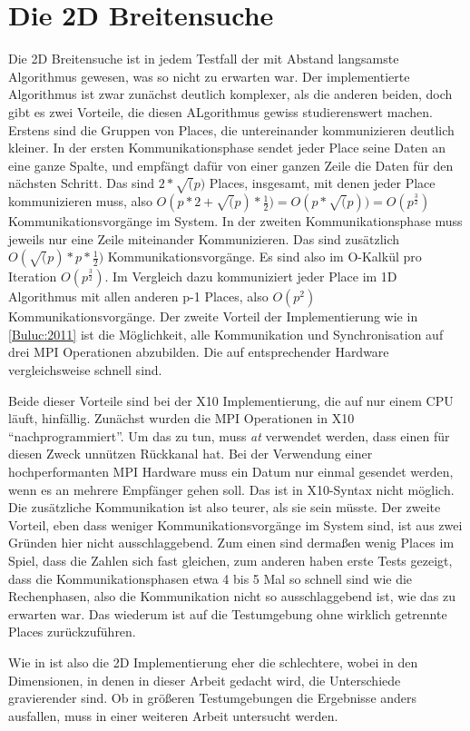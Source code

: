 \section{Die 2D Breitensuche} %
\label{sec:die_2d_breitensuche}
Die 2D Breitensuche ist in jedem Testfall der mit Abstand langsamste Algorithmus gewesen, was so nicht zu erwarten war. Der implementierte Algorithmus ist zwar zunächst deutlich komplexer, als die anderen beiden, doch gibt es zwei Vorteile, die diesen ALgorithmus gewiss studierenswert machen. Erstens sind die Gruppen von Places, die untereinander kommunizieren deutlich kleiner. In der ersten Kommunikationsphase sendet jeder Place seine Daten an eine ganze Spalte, und empfängt dafür von einer ganzen Zeile die Daten für den nächsten Schritt. Das sind $2 * \sqrt(p)$ Places, insgesamt, mit denen jeder Place kommunizieren muss, also $O(p * 2 + \sqrt(p) * \frac{1}{2}) = O(p * \sqrt(p))= O(p^{\frac{3}{2}})$ Kommunikationsvorgänge im System. In der zweiten Kommunikationsphase muss jeweils nur eine Zeile miteinander Kommunizieren. Das sind zusätzlich $O(\sqrt(p) * p * \frac{1}{2})$ Kommunikationsvorgänge. Es sind also im O-Kalkül pro Iteration $O(p^{\frac{3}{2}})$. Im Vergleich dazu kommuniziert jeder Place im 1D Algorithmus mit allen anderen p-1 Places, also $O(p^2)$ Kommunikationsvorgänge. Der zweite Vorteil der Implementierung wie in \ref{Buluc:2011} ist die Möglichkeit, alle Kommunikation und Synchronisation auf drei MPI Operationen abzubilden. Die auf entsprechender Hardware vergleichsweise schnell sind. 

Beide dieser Vorteile sind bei der X10 Implementierung, die auf nur einem CPU läuft, hinfällig. Zunächst wurden die MPI Operationen in X10 \enquote{nachprogrammiert}. Um das zu tun, muss \textit{at} verwendet werden, dass einen für diesen Zweck unnützen Rückkanal hat. Bei der Verwendung einer hochperformanten MPI Hardware muss ein Datum nur einmal gesendet werden, wenn es an mehrere Empfänger gehen soll. Das ist in X10-Syntax nicht möglich. Die zusätzliche Kommunikation ist also teurer, als sie sein müsste. 
Der zweite Vorteil, eben dass weniger Kommunikationsvorgänge im System sind, ist aus zwei Gründen hier nicht ausschlaggebend. Zum einen sind dermaßen wenig Places im Spiel, dass die Zahlen sich fast gleichen, zum anderen haben erste Tests gezeigt, dass die Kommunikationsphasen etwa 4 bis 5 Mal so schnell sind wie die Rechenphasen, also die Kommunikation nicht so ausschlaggebend ist, wie das zu erwarten war. Das wiederum ist auf die Testumgebung ohne wirklich getrennte Places zurückzuführen.

Wie in \cite{Buluc:2011} ist also die 2D Implementierung eher die schlechtere, wobei in den Dimensionen, in denen in dieser Arbeit gedacht wird,  die Unterschiede gravierender sind. Ob in  größeren Testumgebungen die Ergebnisse anders ausfallen, muss in einer weiteren Arbeit untersucht werden.
